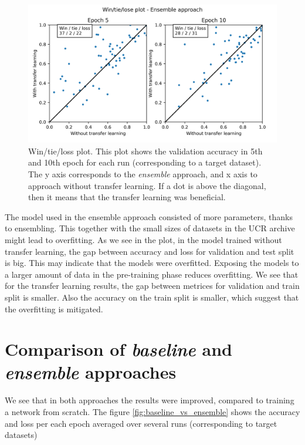 \documentclass[a4paper,11pt,twoside]{report}
\theoremstyle{definition}
\begin{document}
\FloatBarrier
\begin{figure}[h!t]
\centering
\includegraphics[width=17 cm]{imgs/ensemble/win_tie_lose_epoch.png}
\caption{Win/tie/loss plot. This plot shows the validation accuracy in 5th and 10th epoch for each run (corresponding to a target dataset). The y axis corresponds to the \textit{ensemble} approach, and x axis to approach without transfer learning. If a dot is above the diagonal, then it means that the transfer learning was beneficial.}
\label{fig:win_tie_loss_ensemble}
\end{figure}
The model used in the ensemble approach consisted of more parameters, thanks to ensembling. This together with the small sizes of datasets in the UCR archive might lead to overfitting. As we see in the plot, in the model trained without transfer learning, the gap between accuracy and loss for validation and test split is big. This may indicate that the models were overfitted. Exposing the models to a larger amount of data in the pre-training phase reduces overfitting. We see that for the transfer learning results, the gap between metrices for validation and train split is smaller. Also the accuracy on the train split is smaller, which suggest that the overfitting is mitigated.

\section{Comparison of\textit{ baseline }and\textit{ ensemble }approaches}
We see that in both approaches the results were improved, compared to training a network from scratch. The figure \ref{fig:baseline_vs_ensemble} shows the accuracy and loss per each epoch averaged over several runs (corresponding to target datasets)
\end{document}
